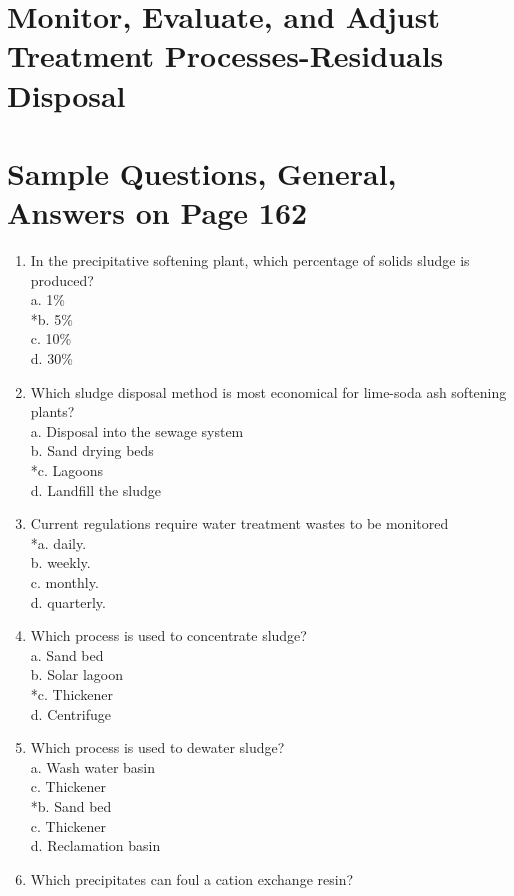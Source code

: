 \section{Monitor, Evaluate, and Adjust Treatment Processes-Residuals Disposal}
\section{Sample Questions, General, Answers on Page 162}
\begin{enumerate}[label=TG-\arabic*]
\item In the precipitative softening plant, which percentage of solids sludge is produced?\\
a. 1\%\\
*b. 5\%\\
c. 10\%\\
d. 30\%\\
\item Which sludge disposal method is most economical for lime-soda ash softening plants?\\
a. Disposal into the sewage system\\
b. Sand drying beds\\
*c. Lagoons\\
d. Landfill the sludge\\
\item Current regulations require water treatment wastes to be monitored\\
*a. daily.\\
b. weekly.\\
c. monthly.\\
d. quarterly.\\
\item Which process is used to concentrate sludge?\\
a. Sand bed\\
b. Solar lagoon\\
*c. Thickener\\
d. Centrifuge\\
\item Which process is used to dewater sludge?\\
a. Wash water basin\\
c. Thickener\\
*b. Sand bed\\
c. Thickener\\
d. Reclamation basin\\
\item Which precipitates can foul a cation exchange resin?\\

\end{enumerate}
